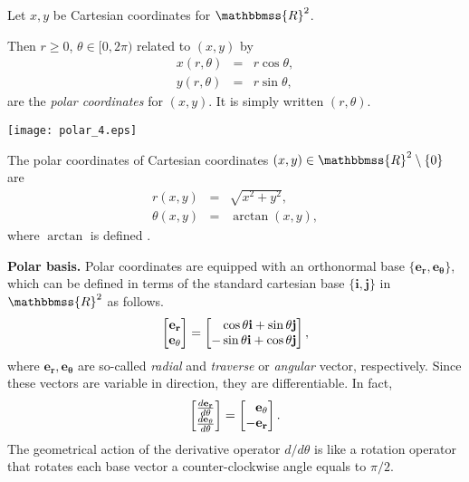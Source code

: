 \documentclass[12pt]{article}
\newcommand{\R}{\mathbbmss{R}}
\begin{document}

Let $x,y$ be Cartesian coordinates for $\R^2$. 

Then $r\ge 0$, $\theta\in [0,2\pi)$ related to $(x,y)$ by
\begin{eqnarray*}
  x(r,\theta) &=& r \cos \theta, \\
  y(r,\theta) &=& r \sin \theta, 
\end{eqnarray*}
are the \emph{polar coordinates} for $(x,y)$.  It is simply written $(r,\theta)$. 

\begin{center}
\texttt{[image: polar\_4.eps]}
\end{center}

The polar coordinates of Cartesian coordinates 
$(x,y) \in \R^2\setminus\{0\}$ are
\begin{eqnarray*}
   r(x,y) &=& \sqrt{x^2+ y^2}, \\
   \theta(x,y) &=& \arctan (x,y),
\end{eqnarray*}
where $\arctan$ is defined .

\textbf{Polar basis.}
Polar coordinates are equipped with an orthonormal base $\{\mathbf{e_r,e_\theta}\}$, which can be defined in terms of the standard cartesian base $\{\mathbf{i,j}\}$ in $\mathbbmss{R}^2$ as follows.
\begin{align*}
\begin{bmatrix}\mathbf{e_r}\\ \mathbf{e_\theta}\end{bmatrix}=
\begin{bmatrix}\hphantom{-}\cos\theta\mathbf{i}+\sin\theta\mathbf{j}\\ 
-\sin\theta\mathbf{i}+\cos\theta\mathbf{j}\end{bmatrix},
\end{align*}
where $\mathbf{e_r,e_\theta}$ are so-called {\em radial} and {\em traverse} or {\em angular} vector, respectively. Since these vectors are variable in direction, they are differentiable. In fact,
\begin{align*}
\begin{bmatrix}\frac{d\mathbf{e_r}}{d\theta}\\ \frac{d\mathbf{e_\theta}}{d\theta}\end{bmatrix}=
\begin{bmatrix}\hphantom{-}\mathbf{e_\theta}\\ -\mathbf{e_r}\end{bmatrix}.
\end{align*}
The geometrical action of the derivative operator $d/d\theta$ is like a rotation operator that rotates each base vector a counter-clockwise angle equals to $\pi/2$. 
\end{document}
